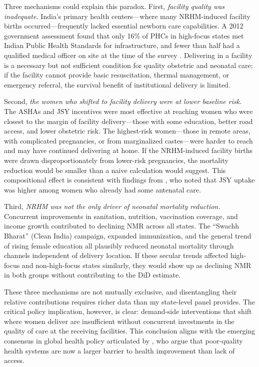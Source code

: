 \documentclass[12pt]{article}
\begin{document}
Three mechanisms could explain this paradox. First, \emph{facility quality was inadequate.} India's primary health centers---where many NRHM-induced facility births occurred---frequently lacked essential newborn care capabilities. A 2012 government assessment found that only 16\% of PHCs in high-focus states met Indian Public Health Standards for infrastructure, and fewer than half had a qualified medical officer on site at the time of the survey \citep{NRHM2012}. Delivering in a facility is a necessary but not sufficient condition for quality obstetric and neonatal care; if the facility cannot provide basic resuscitation, thermal management, or emergency referral, the survival benefit of institutional delivery is limited.

Second, \emph{the women who shifted to facility delivery were at lower baseline risk.} The ASHAs and JSY incentives were most effective at reaching women who were closest to the margin of facility delivery---those with some education, better road access, and lower obstetric risk. The highest-risk women---those in remote areas, with complicated pregnancies, or from marginalized castes---were harder to reach and may have continued delivering at home. If the NRHM-induced facility births were drawn disproportionately from lower-risk pregnancies, the mortality reduction would be smaller than a naive calculation would suggest. This compositional effect is consistent with findings from \citet{lim2010india}, who noted that JSY uptake was higher among women who already had some antenatal care.

Third, \emph{NRHM was not the only driver of neonatal mortality reduction.} Concurrent improvements in sanitation, nutrition, vaccination coverage, and income growth contributed to declining NMR across all states. The ``Swachh Bharat'' (Clean India) campaign, expanded immunization, and the general trend of rising female education all plausibly reduced neonatal mortality through channels independent of delivery location. If these secular trends affected high-focus and non-high-focus states similarly, they would show up as declining NMR in both groups without contributing to the DiD estimate.

These three mechanisms are not mutually exclusive, and disentangling their relative contributions requires richer data than my state-level panel provides. The critical policy implication, however, is clear: demand-side interventions that shift where women deliver are insufficient without concurrent investments in the quality of care at the receiving facilities. This conclusion aligns with the emerging consensus in global health policy articulated by \citet{kruk2018lancet}, who argue that poor-quality health systems are now a larger barrier to health improvement than lack of access.
\end{document}

